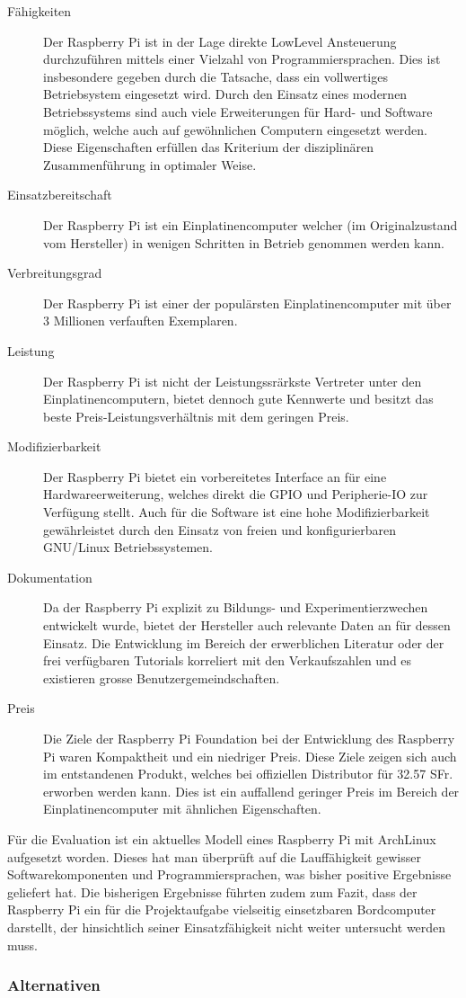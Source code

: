 \begin{description}
	\item[Fähigkeiten] Der Raspberry Pi ist in der Lage direkte
		LowLevel Ansteuerung durchzuführen mittels einer Vielzahl
		von Programmiersprachen. Dies ist insbesondere gegeben
		durch die Tatsache, dass ein vollwertiges Betriebsystem
		eingesetzt wird. Durch den Einsatz eines modernen
		Betriebssystems sind auch viele Erweiterungen für Hard- 
		und Software möglich, welche auch auf gewöhnlichen 
		Computern eingesetzt werden. Diese Eigenschaften erfüllen
		das Kriterium der disziplinären Zusammenführung in 
		optimaler Weise.
	\item[Einsatzbereitschaft] Der Raspberry Pi ist ein 
		Einplatinencomputer welcher (im Originalzustand vom 
		Hersteller) in wenigen Schritten in Betrieb genommen
		werden kann. 
	\item[Verbreitungsgrad] Der Raspberry Pi ist einer der
		populärsten Einplatinencomputer mit über 3 Millionen
		verfauften Exemplaren.
	\item[Leistung] Der Raspberry Pi ist nicht der Leistungssrärkste
		Vertreter unter den Einplatinencomputern, bietet dennoch
		gute Kennwerte und besitzt das beste
		Preis-Leistungsverhältnis mit dem geringen Preis.
	\item[Modifizierbarkeit] Der Raspberry Pi bietet ein vorbereitetes
		Interface an für eine Hardwareerweiterung, welches direkt
		die GPIO und Peripherie-IO zur Verfügung stellt. Auch
		für die Software ist eine hohe Modifizierbarkeit 
		gewährleistet durch den Einsatz von freien und 
		konfigurierbaren GNU/Linux Betriebssystemen.
	\item[Dokumentation] Da der Raspberry Pi explizit zu 
		Bildungs- und Experimentierzwechen entwickelt wurde, 
		bietet der Hersteller auch relevante Daten an für dessen
		Einsatz. Die Entwicklung im Bereich der
		erwerblichen Literatur oder der frei verfügbaren
		Tutorials korreliert mit den Verkaufszahlen und es 
		existieren grosse Benutzergemeindschaften.
	\item[Preis] Die Ziele der Raspberry Pi Foundation bei der
		Entwicklung des Raspberry Pi waren Kompaktheit und ein 
		niedriger Preis. Diese Ziele zeigen sich auch im
		entstandenen Produkt, welches bei offiziellen Distributor
		für 32.57 SFr. erworben werden kann. Dies ist ein 
		auffallend geringer Preis im Bereich der 
		Einplatinencomputer mit ähnlichen Eigenschaften.
\end{description}

Für die Evaluation ist ein aktuelles Modell eines Raspberry Pi mit
ArchLinux aufgesetzt worden. Dieses hat man überprüft auf die 
Lauffähigkeit gewisser Softwarekomponenten und Programmiersprachen,
was bisher positive Ergebnisse geliefert hat. Die bisherigen Ergebnisse
führten zudem zum Fazit, dass der Raspberry Pi ein für die Projektaufgabe
vielseitig einsetzbaren Bordcomputer darstellt, der hinsichtlich seiner
Einsatzfähigkeit nicht weiter untersucht werden muss.

\subsubsection{Alternativen}
